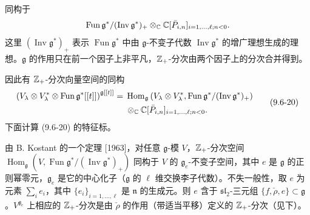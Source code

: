同构于
\[
    \operatorname{Fun}\mathfrak{g}^*/(\operatorname{Inv}\mathfrak{g}^*)_+
    \otimes_{\mathbb{C}}\mathbb{C}[\bar P_{i,n}]_{i=1,\dots,\ell;n<0}.
\]
这里 $(\operatorname{Inv}\mathfrak{g}^*)_+$ 表示 $\operatorname{Fun}\mathfrak{g}^*$ 中由 $\mathfrak{g}$-不变子代数 $\operatorname{Inv}\mathfrak{g}^*$ 的增广理想生成的理想。$\mathfrak{g}$ 的作用只在前一个因子上非平凡，$\mathbb{Z}_+$-分次由两个因子上的分次合并得到。

因此有 $\mathbb{Z}_+$-分次向量空间的同构
\begin{equation}
    \begin{aligned}
        \left(V_\lambda\otimes V_\lambda^*\otimes\operatorname{Fun}\mathfrak{g}^*[[t]]\right)^{\mathfrak{g}[[t]]}
        =\;&\operatorname{Hom}_{\mathfrak{g}}\left(V_\lambda\otimes V_\lambda^*,
            \operatorname{Fun}\mathfrak{g}^*/(\operatorname{Inv}\mathfrak{g}^*)_+\right)\\
        &\otimes_{\mathbb{C}}\mathbb{C}[\bar P_{i,n}]_{i=1,\dots,\ell;n<0}.
    \end{aligned}
    \tag{9.6-20}
\end{equation}
下面计算 (9.6-20) 的特征标。

由 B. Kostant 的一个定理 [1963]，对任意 $\mathfrak{g}$-模 $V$，$\mathbb{Z}_+$-分次空间
$\operatorname{Hom}_{\mathfrak{g}}(V,\operatorname{Fun}\mathfrak{g}^*/(\operatorname{Inv}\mathfrak{g}^*)_+)$ 同构于 $V$ 的 $\mathfrak{g}_e$-不变子空间，其中 $e$ 是 $\mathfrak{g}$ 的正则幂零元，$\mathfrak{g}_e$ 是它的中心化子（$\mathfrak{g}$ 的 $\ell$ 维交换李子代数）。不失一般性，取 $e$ 为元素 $\sum_i e_i$，其中 $\{e_i\}_{i=1,\dots,\ell}$ 是 $\mathfrak{n}$ 的生成元。则 $e$ 含于 $\mathfrak{sl}_2$-三元组 $\{f,\check\rho,e\}\subset\mathfrak{g}$。$V^{\mathfrak{g}_e}$ 上相应的 $\mathbb{Z}_+$-分次是由 $\check\rho$ 的作用（带适当平移）定义的 $\mathbb{Z}_+$-分次（见下）。

